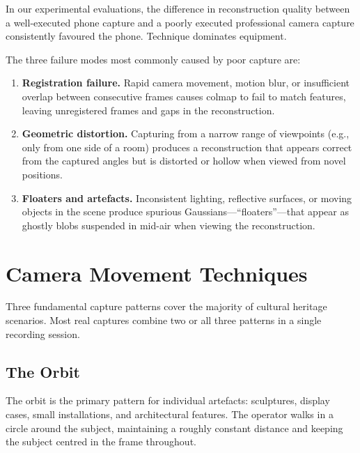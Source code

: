 \begin{keyfinding}
In our experimental evaluations, the difference in reconstruction quality between a well-executed phone capture and a poorly executed professional camera capture consistently favoured the phone. Technique dominates equipment.
\end{keyfinding}

The three failure modes most commonly caused by poor capture are:

\begin{enumerate}
  \item \textbf{Registration failure.} Rapid camera movement, motion blur, or insufficient overlap between consecutive frames causes \acrshort{colmap} to fail to match features, leaving unregistered frames and gaps in the reconstruction.

  \item \textbf{Geometric distortion.} Capturing from a narrow range of viewpoints (e.g., only from one side of a room) produces a reconstruction that appears correct from the captured angles but is distorted or hollow when viewed from novel positions.

  \item \textbf{Floaters and artefacts.} Inconsistent lighting, reflective surfaces, or moving objects in the scene produce spurious Gaussians---``floaters''---that appear as ghostly blobs suspended in mid-air when viewing the reconstruction.
\end{enumerate}

\section{Camera Movement Techniques}
\label{sec:cap-movement}

Three fundamental capture patterns cover the majority of cultural heritage scenarios. Most real captures combine two or all three patterns in a single recording session.

\subsection{The Orbit}
\label{sec:cap-orbit}

The orbit is the primary pattern for individual artefacts: sculptures, display cases, small installations, and architectural features. The operator walks in a circle around the subject, maintaining a roughly constant distance and keeping the subject centred in the frame throughout.

